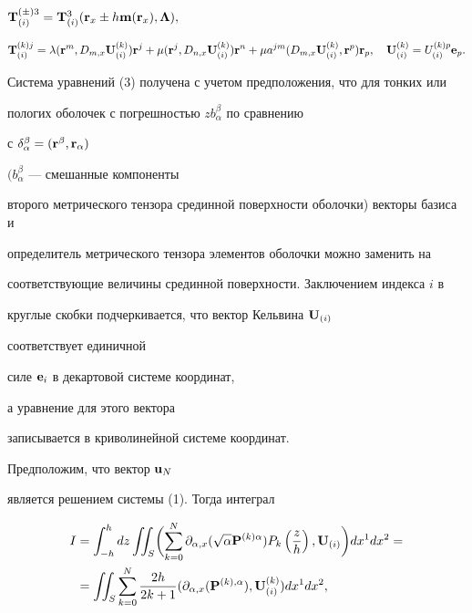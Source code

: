$ {\bold T}^{(\pm)3}_{(i)}={\bold T}^3_{(i)}({\bold r}_x\pm h{\bold m} 


({\bold r}_x), {\boldsymbol \Lambda}),$ 


\begin{equation} 


{\bold T}^{(k)j}_{(i)}=\lambda({\bold r}^m, D_{m,x} 


{\bold U}^{(k)}_{(i)}){\bold r}^j +\mu({\bold r}^j, D_{n,x} 


{\bold U}^{(k)}_{(i)}){\bold r}^n 


+\mu a^{jm}(D_{m,x}{\bold U}^{(k)}_{(i)},{\bold r}^p){\bold r}_p, 


\quad {\bold U}^{(k)}_{(i)}=U^{(k)p}_{(i)}{\bold e}_p. 


\end{equation} 


Система уравнений (3) получена с учетом предположения, что для тонких или 


пологих оболочек с погрешностью $zb^\beta_\alpha$ по сравнению 


с $\delta^\beta_\alpha=({\bold r}^\beta,{\bold r}_\alpha)$ 


$(b^\beta_\alpha$ --- смешанные компоненты 


второго метрического тензора срединной поверхности оболочки) векторы базиса и 


определитель метрического тензора элементов оболочки можно заменить на 


соответствующие величины срединной поверхности. Заключением индекса $i$ в 


круглые скобки подчеркивается, что вектор Кельвина ${\bold U}_{(i)}$ 


соответствует единичной 


силе ${\bold e}_i$ в декартовой системе координат, 


а уравнение для этого вектора 


записывается в криволинейной системе координат. 


 


Предположим, что вектор ${\bold u}_N$ 


является решением системы (1). Тогда интеграл 


\begin{align*} 


I &=\int^h_{-h}dz \iint_S\biggl(\sum^N_{k=0}\partial_{\alpha,x} 


(\sqrt\alpha{\bold P}^{(k)\alpha})P_k\left(\frac{z}{h}\right ), 


{\bold U}_{(i)}\biggr)dx^1 dx^2 =\\ 


%


&=\iint_S\sum^N_{k=0}\frac{2h}{2k+1}(\partial_{\alpha,x} 


({\bold P}^{(k),\alpha}),{\bold U}^{(k)}_{(i)})dx^1 dx^2, 


\end{align*} 


